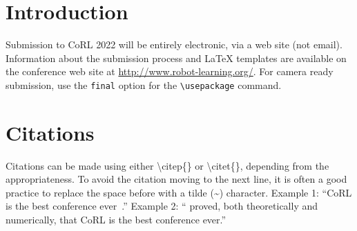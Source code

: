 \documentclass{article}
\begin{document}
\section{Introduction}
	
    Submission to CoRL 2022 will be entirely electronic, via a web site (not email). Information about the submission process and \LaTeX{} templates are available on the conference web site at \url{http://www.robot-learning.org/}. For camera ready submission, use the \texttt{final} option for the \texttt{\textbackslash usepackage} command. 


\section{Citations}
\label{sec:citations}

	Citations can be made using either \textbackslash citep\{\} or \textbackslash citet\{\}, depending from the appropriateness. To avoid the citation moving to the next line, it is often a good practice to replace the space before with a tilde (\~{}) character.
	Example 1: ``CoRL is the best conference ever~\citep{Gauss1857}.''
	Example 2: ``\citet{Gauss1857} proved, both theoretically and numerically, that CoRL is the best conference ever.''
	





\clearpage


\end{document}
